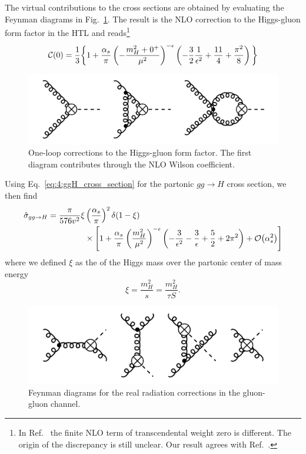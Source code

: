 The virtual contributions to the cross sections are obtained by evaluating the Feynman diagrams in Fig.~\ref{fig:4:ggH}. The result is the NLO correction to the Higgs-gluon form factor in the HTL and reads\footnote{In Ref.~\cite{Dawson:1990zj} the finite \acs{NLO} term of transcendental weight zero is different. The origin of the discrepancy is still unclear. Our result agrees with Ref.~\cite{Harlander:2002wh}.}
\begin{equation}
\mathcal{C}(0) = \frac{1}{3} \bigg \lbrace 1 + \frac{\alpha_s}{\pi} \left(- \frac{m_H^2 + 0^+}{\mu^2} \right)^{-\epsilon} \left(-\frac{3}{2} \frac{1}{\epsilon^2} + \frac{11}{4} + \frac{\pi^2}{8} \right) \bigg \rbrace
\end{equation}
\begin{figure}[h]
\centering
\includegraphics[scale=0.3]{Images/NLO_Feynman_diagrams/ggH.pdf}
\caption{One-loop corrections to the Higgs-gluon form factor. The first diagram contributes through the NLO Wilson coefficient.}
\label{fig:4:ggH}
\end{figure}
Using Eq.~\eqref{eq:4:ggH_cross_section} for the partonic $gg \rightarrow H$ cross section, we then find
\begin{equation}
\begin{split}
\hat{\sigma}_{gg \rightarrow H} = \frac{\pi}{576 v^2} \xi & \left(\frac{\alpha_s}{\pi} \right)^2 \delta(1 - \xi) \\
& \times \left[ 1 + \frac{\alpha_s}{\pi} \left(\frac{m_H^2}{\mu^2} \right)^{-\epsilon} \left(-\frac{3}{\epsilon^2} - \frac{3}{\epsilon} + \frac{5}{2} + 2 \pi^2 \right) + \mathcal{O}\!\left(\alpha_s^2\right) \right]
\end{split}
\end{equation}
where we defined $\xi$ as the of the Higgs mass over the partonic center of mass energy
\begin{equation}
  \xi = \frac{m_H^2}{s} = \frac{m_H^2}{\tau S}.
\end{equation}
\begin{figure}
  \centering
  \includegraphics[scale=0.3]{Images/NLO_Feynman_diagrams/ggHg.pdf}
  \caption{Feynman diagrams for the real radiation corrections in the gluon-gluon channel.}
  \label{fig:4:ggHg}
\end{figure}

